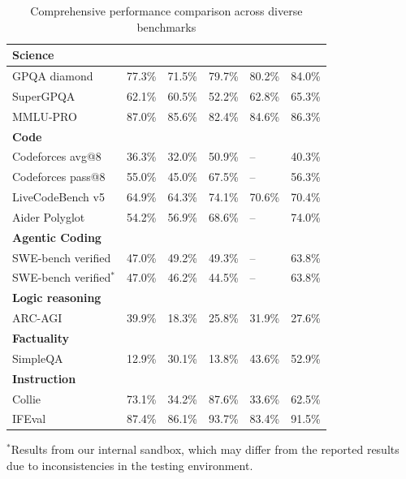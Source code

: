 \begin{table}[h]
\centering
\begin{tabular}{p{3cm}p{1.5cm}p{1.5cm}p{1.5cm}p{1.5cm}p{1.5cm}}
\toprule
\multicolumn{6}{p{12cm}}{\textbf{Science}} \\
\hline
GPQA diamond & 77.3\% & 71.5\% & 79.7\% & 80.2\%  & 84.0\% \\
SuperGPQA & 62.1\% & 60.5\% & 52.2\% & 62.8\%  & 65.3\% \\
MMLU-PRO & 87.0\% & 85.6\% & 82.4\% & 84.6\% & 86.3\% \\
\hline
\multicolumn{6}{p{12cm}}{\textbf{Code}} \\
\hline
Codeforces avg@8 & 36.3\% & 32.0\% & 50.9\% & -- & 40.3\% \\
Codeforces pass@8  & 55.0\% & 45.0\% & 67.5\% & -- & 56.3\% \\
LiveCodeBench v5 & 64.9\% & 64.3\% & 74.1\% & 70.6\% & 70.4\% \\
Aider Polyglot & 54.2\% & 56.9\%  &  68.6\% & --  & 74.0\% \\
\hline
\multicolumn{6}{p{12cm}}{\textbf{Agentic Coding}} \\
\hline
SWE-bench verified & 47.0\% & 49.2\% & 49.3\% & --  & 63.8\% \\
SWE-bench verified$^*$ & 47.0\%  & 46.2\% & 44.5\%   & --  & 63.8\% \\
\hline
\multicolumn{6}{p{12cm}}{\textbf{Logic reasoning}} \\
\hline
ARC-AGI & 39.9\% & 18.3\%  & 25.8\% & 31.9\%  & 27.6\% \\
\hline
\multicolumn{6}{p{12cm}}{\textbf{Factuality}} \\
\hline
SimpleQA & 12.9\% & 30.1\% & 13.8\%& 43.6\% & 52.9\% \\
\hline
\multicolumn{6}{p{12cm}}{\textbf{Instruction}} \\
\hline
Collie & 73.1\%  & 34.2\% & 87.6\% & 33.6\% & 62.5\% \\
IFEval & 87.4\% & 86.1\% & 93.7\% & 83.4\% & 91.5\% \\
\bottomrule
\end{tabular}
\caption{Comprehensive performance comparison across diverse benchmarks}
\label{tab:comprehensive-results}
\end{table}
\begin{flushleft}
$^*$\footnotesize{Results from our internal sandbox, which may differ from the reported results due to inconsistencies in the testing environment.}
\end{flushleft}

